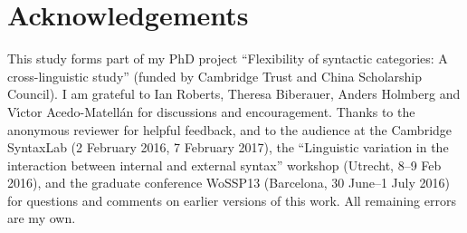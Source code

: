 \documentclass[output=paper]{langsci/langscibook}
\begin{document}
\printchapterglossary{}

\section*{Acknowledgements}

This study forms part of my PhD project ``Flexibility of syntactic categories: A
cross-linguistic study'' (funded by Cambridge Trust and China Scholarship
Council). I am grateful to Ian Roberts, Theresa Biberauer, Anders Holmberg and
V\'{\i}ctor Acedo-Matell\'{a}n for discussions and encouragement. Thanks to the
anonymous reviewer for helpful feedback, and to the audience at the Cambridge
SyntaxLab (2 February 2016, 7 February 2017), the ``Linguistic variation in the
interaction between internal and external syntax'' workshop (Utrecht, 8--9 Feb
2016), and the graduate conference WoSSP13 (Barcelona, 30 June--1 July 2016)
for questions and comments on earlier versions of this work. All remaining
errors are my own.

{\sloppy\printbibliography[heading=subbibliography,notkeyword=this]}
\end{document}

